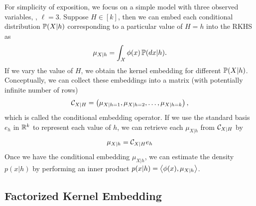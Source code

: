 \documentclass{article}
\begin{document}
For simplicity of exposition, we  focus on a simple model with three observed variables, \ie, $\ell=3$. Suppose $H\in[k]$, then we can embed each conditional distribution $\mathbb{P}(X|h)$ corresponding to a particular value of $H=h$ into the RKHS as
\begin{align}
  \mu_{X|h} = \int_{\mathcal{X}} \phi(x)\, \mathbb{P}(dx | h).
\end{align}
If we vary the value of $H$, we  obtain the kernel embedding for different $\mathbb{P}(X|h)$. Conceptually, we can collect these embeddings into a matrix (with potentially infinite number of rows)
\begin{align}
  \mathcal{C}_{X|H} = \left(\mu_{X|h=1},\mu_{X|h=2},\ldots,\mu_{X|h=k}\right),
\end{align}
which is called the conditional embedding operator. If we use the standard basis $e_h$ in $\mathbb{R}^k$ to represent each value of $h$, we can retrieve each $\mu_{X|h}$ from $\mathcal{C}_{X|H}$ by
\begin{align}
  \mu_{X|h} = \mathcal{C}_{X|H} e_h
\end{align}
Once we have the conditional embedding $\mu_{X|h}$, we can estimate the density $p(x|h)$ by performing an inner product $p(x|h) = \left\langle \phi(x),\mu_{X|h} \right\rangle$.

\subsection{Factorized Kernel Embedding}
\end{document}
